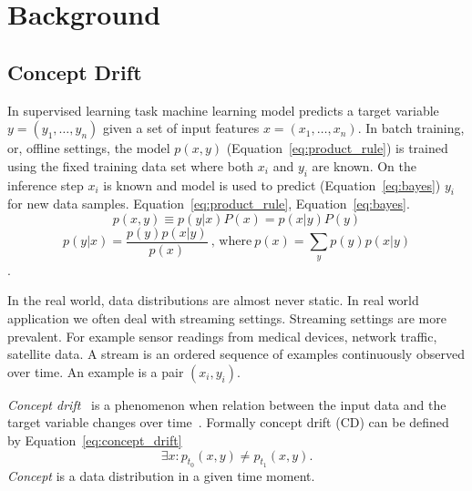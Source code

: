\chapter{Background}

\section{Concept Drift}

In supervised learning task machine learning model predicts a target variable $y = (y_1, \dots, y_n)$ given a set of input features $x = (x_1, \dots, x_n)$.
In batch training, or, offline settings, the model $p(x, y)$ (Equation~\ref{eq:product_rule}) is trained using the fixed training data set where both $x_i$ and $y_i$ are known.  On the inference step $x_i$ is known and model is used to predict (Equation~\ref{eq:bayes}) $y_i$ for new data samples. 
Equation~\ref{eq:product_rule}, Equation~\ref{eq:bayes}.
\begin{equation}\label{eq:product_rule}
  p(x,y) \equiv p(y|x)P(x) = p(x|y)P(y)
\end{equation}
\begin{equation}\label{eq:bayes}
  p(y | x) = \frac{p(y) p(x|y)}{p(x)}\: \text{, where}\: p(x)=\sum_{y} p(y) p(x|y)
\end{equation}.

In the real world, data distributions are almost never static. 
In real world application we often deal with streaming settings.
Streaming settings are more prevalent.
For example sensor readings from medical devices, network traffic, satellite data.
A stream is an ordered sequence of examples continuously observed over time. 
An example is a pair $(x_i, y_i)$.

\textit{Concept drift}~\cite{Widmer1996,schlimmer1986incremental,gama2014survey} is a phenomenon when relation between the input data and the target variable changes over time~\cite{gama2014survey}. 
Formally concept drift (CD) can be defined~\cite{gama2014survey} by Equation~\ref{eq:concept_drift}
\begin{equation}\label{eq:concept_drift}
    \exists x: p_{t_0}(x,y) \neq  p_{t_1}(x,y).
\end{equation}
\textit{Concept} is a data distribution in a given time moment.

